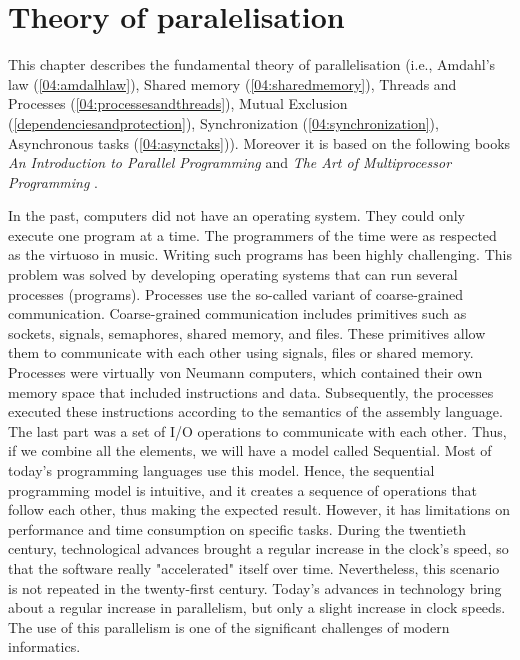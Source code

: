 \chapter{Theory of paralelisation}
\label{03:chapter:title}

This chapter describes the fundamental theory of parallelisation (i.e., Amdahl's law (\ref{04:amdalhlaw}), Shared memory (\ref{04:sharedmemory}), Threads and Processes (\ref{04:processesandthreads}), Mutual Exclusion (\ref{dependenciesandprotection}), Synchronization (\ref{04:synchronization}), Asynchronous tasks (\ref{04:asynctaks})). Moreover it is based on the following books \emph{An Introduction to Parallel Programming} \cite{introductionToParallelProgramming} and \emph{The Art of Multiprocessor Programming} \cite{artOfMultiprocessorProgramming}.

In the past, computers did not have an operating system. They could only execute one program at a time. The programmers of the time were as respected as the virtuoso in music. Writing such programs has been highly challenging. This problem was solved by developing operating systems that can run several processes (programs).
Processes use the so-called variant of coarse-grained communication.
Coarse-grained communication includes primitives such as sockets, signals, semaphores, shared memory, and files. These primitives allow them to communicate with each other using signals, files or shared memory.  Processes were virtually von Neumann computers, which contained their own memory space that included instructions and data. Subsequently, the processes executed these instructions according to the semantics of the assembly language. The last part was a set of I/O operations to communicate with each other. Thus, if we combine all the elements, we will have a model called Sequential. Most of today's programming languages use this model.  Hence, the sequential programming model is intuitive, and it creates a sequence of operations that follow each other, thus making the expected result. However, it has limitations on performance and time consumption on specific tasks. During the twentieth century, technological advances brought a regular increase in the clock's speed, so that the software really "accelerated" itself over time. Nevertheless, this scenario is not repeated in the twenty-first century. Today's advances in technology bring about a regular increase in parallelism, but only a slight increase in clock speeds. The use of this parallelism is one of the significant challenges of modern informatics.

